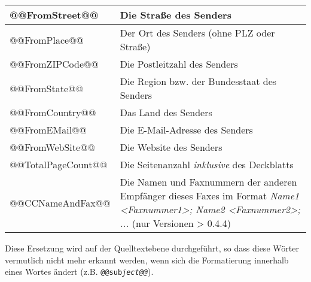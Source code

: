 \documentclass[a4paper,10pt,halfparskip,noparindent]{scrartcl}
\begin{document}
\begin{center}
\begin{tabular}{|l|p{}|}
\ttfamily @@FromStreet@@ & Die Straße des Senders \\\hline
\ttfamily @@FromPlace@@ & Der Ort des Senders (ohne PLZ oder Straße)\\\hline
\ttfamily @@FromZIPCode@@ & Die Postleitzahl des Senders \\\hline
\ttfamily @@FromState@@ & Die Region bzw. der Bundesstaat des Senders\\\hline
\ttfamily @@FromCountry@@ & Das Land des Senders\\\hline
\ttfamily @@FromEMail@@ & Die E-Mail-Adresse des Senders\\\hline
\ttfamily @@FromWebSite@@ & Die Website des Senders\\\hline
\ttfamily @@TotalPageCount@@ & Die Seitenanzahl \textit{inklusive} des Deckblatts \\\hline
\ttfamily @@CCNameAndFax@@ & Die Namen und Faxnummern der anderen Empfänger dieses Faxes im Format \textit{Name1 <Faxnummer1>; Name2 <Faxnummer2>; ...} (nur Versionen > 0.4.4)\\\hline
\end{tabular}
\end{center}

Diese Ersetzung wird auf der Quelltextebene durchgeführt, so dass diese Wörter vermutlich nicht mehr erkannt werden, wenn sich die Formatierung innerhalb eines Wortes ändert (z.B. \texttt{@@sub\textit{ject@@}}).
\end{document}
